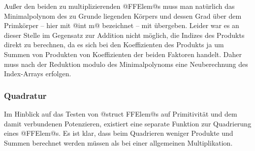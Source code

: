 Außer den beiden zu multiplizierenden @FFElem@s muss man natürlich das
Minimalpolynom des zu Grunde liegenden Körpers und dessen Grad über dem
Primkörper -- hier mit @int m@ bezeichnet -- mit übergeben.
Leider war es an dieser Stelle im Gegensatz zur Addition nicht 
möglich, die Indizes des Produkts direkt zu berechnen, da es sich bei den
Koeffizienten des Produkts ja um Summen von Produkten von Koeffizienten der beiden
Faktoren handelt. Daher muss nach der
Reduktion modulo des Minimalpolynoms eine Neuberechnung des Index-Arrays erfolgen.

\subsubsection{Quadratur}
Im Hinblick auf das Testen von @struct FFElem@s auf Primitivität und dem damit
verbundenen Potenzieren, existiert eine separate Funktion zur Quadrierung eines 
@FFElem@s. Es ist klar, dass beim Quadrieren weniger Produkte und Summen
berechnet werden müssen als bei einer allgemeinen Multiplikation.
